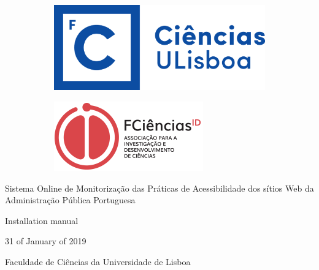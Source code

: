 \pagestyle{empty}

\begin{center}
    \begin{figure}
        \begin{subfigure}{.5\textwidth}
            \centering
            \includegraphics[width=.7\linewidth]{lib/images/logo/fcul_logo.png}
        \end{subfigure}
        \begin{subfigure}{.5\textwidth}
            \centering
            \includegraphics[width=.7\linewidth]{lib/images/logo/FCiencias_ID.png}
        \end{subfigure}
    \end{figure}
    
    \vspace*{3cm}
    
    \Large{Sistema Online de Monitorização das Práticas de Acessibilidade dos sítios Web da Administração Pública Portuguesa}\\
    \vspace{1cm}
    \vfill

    \large{Installation manual}\\
    \vspace{1.5cm}
    
    \vspace{1.2cm}
    
    \vfill
    31 of January of 2019
    
    \vspace{1.5 cm}
    \vfill
    
    Faculdade de Ciências da Universidade de Lisboa
    
    \vfill
    
\end{center}